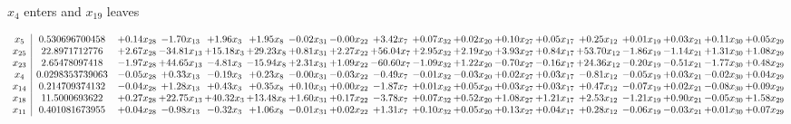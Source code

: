 \documentclass[9pt]{article}
\begin{document}
 $ x_{4} $ enters and $ x_{19} $ leaves 

 \[\begin{array}{c| c c@{\hskip 2pt} c@{\hskip 2pt} c@{\hskip 2pt} c@{\hskip 2pt} c@{\hskip 2pt} c@{\hskip 2pt} c@{\hskip 2pt} c@{\hskip 2pt} c@{\hskip 2pt} c@{\hskip 2pt} c@{\hskip 2pt} c@{\hskip 2pt} c@{\hskip 2pt} c@{\hskip 2pt} c@{\hskip 2pt} c@{\hskip 2pt} }
 x_{5}   &  0.530696700458 & +  0.14 x_{28} & -1.70 x_{13} & +  1.96 x_{3} & +  1.95 x_{8} & -0.02 x_{31} & -0.00 x_{22} & +  3.42 x_{7} & +  0.07 x_{32} & +  0.02 x_{20} & +  0.10 x_{27} & +  0.05 x_{17} & +  0.25 x_{12} & +  0.01 x_{19} & +  0.03 x_{21} & +  0.11 x_{30} & +  0.05 x_{29}\\
 x_{25}   &  22.8971712776 & +  2.67 x_{28} & -34.81 x_{13} & + 15.18 x_{3} & + 29.23 x_{8} & +  0.81 x_{31} & +  2.27 x_{22} & + 56.04 x_{7} & +  2.95 x_{32} & +  2.19 x_{20} & +  3.93 x_{27} & +  0.84 x_{17} & + 53.70 x_{12} & -1.86 x_{19} & -1.14 x_{21} & +  1.31 x_{30} & +  1.08 x_{29}\\
 x_{23}   &  2.65478097418 & -1.97 x_{28} & + 44.65 x_{13} & -4.81 x_{3} & -15.94 x_{8} & +  2.31 x_{31} & +  1.09 x_{22} & -60.60 x_{7} & -1.09 x_{32} & +  1.22 x_{20} & -0.70 x_{27} & -0.16 x_{17} & + 24.36 x_{12} & -0.20 x_{19} & -0.51 x_{21} & -1.77 x_{30} & +  0.48 x_{29}\\
 x_{4}   &  0.0298353739063 & -0.05 x_{28} & +  0.33 x_{13} & -0.19 x_{3} & +  0.23 x_{8} & -0.00 x_{31} & -0.03 x_{22} & -0.49 x_{7} & -0.01 x_{32} & -0.03 x_{20} & +  0.02 x_{27} & +  0.03 x_{17} & -0.81 x_{12} & -0.05 x_{19} & +  0.03 x_{21} & -0.02 x_{30} & +  0.04 x_{29}\\
 x_{14}   &  0.214709374132 & -0.04 x_{28} & +  1.28 x_{13} & +  0.43 x_{3} & +  0.35 x_{8} & +  0.10 x_{31} & +  0.00 x_{22} & -1.87 x_{7} & +  0.01 x_{32} & +  0.05 x_{20} & +  0.03 x_{27} & +  0.03 x_{17} & +  0.47 x_{12} & -0.07 x_{19} & +  0.02 x_{21} & -0.08 x_{30} & +  0.09 x_{29}\\
 x_{18}   &  11.5000693622 & +  0.27 x_{28} & + 22.75 x_{13} & + 40.32 x_{3} & + 13.48 x_{8} & +  1.60 x_{31} & +  0.17 x_{22} & -3.78 x_{7} & +  0.07 x_{32} & +  0.52 x_{20} & +  1.08 x_{27} & +  1.21 x_{17} & +  2.53 x_{12} & -1.21 x_{19} & +  0.90 x_{21} & -0.05 x_{30} & +  1.58 x_{29}\\
 x_{11}   &  0.401081673955 & +  0.04 x_{28} & -0.98 x_{13} & -0.32 x_{3} & +  1.06 x_{8} & -0.01 x_{31} & +  0.02 x_{22} & +  1.31 x_{7} & +  0.10 x_{32} & +  0.05 x_{20} & +  0.13 x_{27} & +  0.04 x_{17} & +  0.28 x_{12} & -0.06 x_{19} & -0.03 x_{21} & +  0.01 x_{30} & +  0.07 x_{29}\\

\end{array}\]
\end{document}
